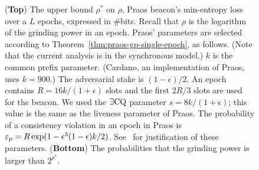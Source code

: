 \begin{figure}[!htb]
  \caption{
    (\textbf{Top}) The upper bound $\rho^*$ on $\rho$, 
    Praos beacon's min-entropy loss over a $L$ epochs, 
    expressed in \#bits.  
    Recall that $\rho$ is the logarithm of the grinding power in an epoch.     
    Praos' parameters are selected according to Theorem~\ref{thm:praos-gp-single-epoch}, 
    as follows.
    (Note that the current analysis is in the synchronous model.)
    $k$ is the common prefix parameter. 
    (Cardano, an implementation of Praos, uses $k = 900$.) 
    The adversarial stake is $(1-\epsilon)/2$.
    An epoch contains $R = 16 k/(1+\epsilon)$ slots and the first $2R/3$ slots are used for the beacon. 
    We used the $\exists\mathrm{CQ}$ parameter $s = 8 k/(1+\epsilon)$; 
    this value is the same as the liveness parameter of Praos. 
    The probability of a consistency violation in an epoch in Praos is 
    $\mathsf{\varepsilon}_p = R \exp(1-\epsilon^3 (1-\epsilon)k/2) $. 
    See~\citet[Theorem 9]{Praos} for justification of these parameters. 
    (\textbf{Bottom}) The probabilities that the grinding power is larger than $2^{\rho^*}$.
  }
  \label{fig:praos-beacon-multi-epoch}
\end{figure}
